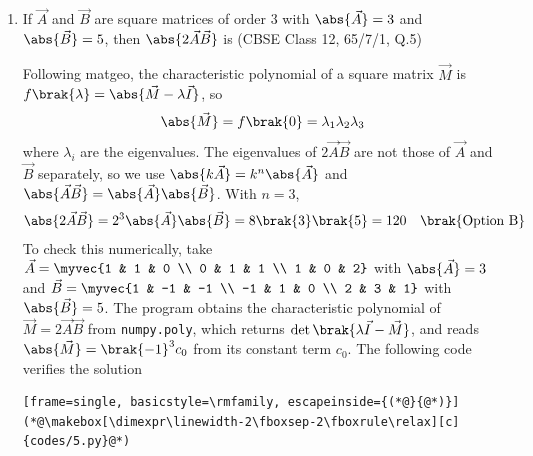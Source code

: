 \begin{enumerate}[label=\thesubsection.\arabic*, ref=\thesubsection.\theenumi]
\solution
(theory only) A matrix is symmetric if $\vec{A}^{\top} = \vec{A}$. For a diagonal matrix the transpose leaves every entry unchanged,
\begin{align}
	\vec{A}^{\top} = \myvec{3 & 0 & 0 \\ 0 & 2 & 0 \\ 0 & 0 & 5} = \vec{A}
\end{align}
The diagonal entries are not all equal, so $\vec{A}$ is not a scalar matrix; it is neither the identity nor the null matrix. Hence $\vec{A}$ is a symmetric matrix $\brak{\text{Option D}}$.

\item
If $\vec{A}$ and $\vec{B}$ are square matrices of order $3$ with $\abs{\vec{A}} = 3$ and $\abs{\vec{B}} = 5$, then $\abs{2\vec{A}\vec{B}}$ is
\hfill (CBSE Class 12, 65/7/1, Q.5)

\solution
Following matgeo, the characteristic polynomial of a square matrix $\vec{M}$ is $f\brak{\lambda} = \abs{\vec{M} - \lambda\vec{I}}$, so
\begin{align}
	\abs{\vec{M}} = f\brak{0} = \lambda_1\lambda_2\lambda_3
\end{align}
where $\lambda_i$ are the eigenvalues. The eigenvalues of $2\vec{A}\vec{B}$ are not those of $\vec{A}$ and $\vec{B}$ separately, so we use $\abs{k\vec{A}} = k^n\abs{\vec{A}}$ and $\abs{\vec{A}\vec{B}} = \abs{\vec{A}}\abs{\vec{B}}$. With $n = 3$,
\begin{align}
	\abs{2\vec{A}\vec{B}} = 2^3\abs{\vec{A}}\abs{\vec{B}} = 8\brak{3}\brak{5} = 120 \quad \brak{\text{Option B}}
\end{align}
To check this numerically, take $\vec{A} = \myvec{1 & 1 & 0 \\ 0 & 1 & 1 \\ 1 & 0 & 2}$ with $\abs{\vec{A}} = 3$ and $\vec{B} = \myvec{1 & -1 & -1 \\ -1 & 1 & 0 \\ 2 & 3 & 1}$ with $\abs{\vec{B}} = 5$. The program obtains the characteristic polynomial of $\vec{M} = 2\vec{A}\vec{B}$ from \texttt{numpy.poly}, which returns $\det\brak{\lambda\vec{I} - \vec{M}}$, and reads $\abs{\vec{M}} = \brak{-1}^3 c_0$ from its constant term $c_0$. The following code verifies the solution
\begin{lstlisting}[frame=single, basicstyle=\rmfamily, escapeinside={(*@}{@*)}]
(*@\makebox[\dimexpr\linewidth-2\fboxsep-2\fboxrule\relax][c]{codes/5.py}@*)
\end{lstlisting}


\end{enumerate}
